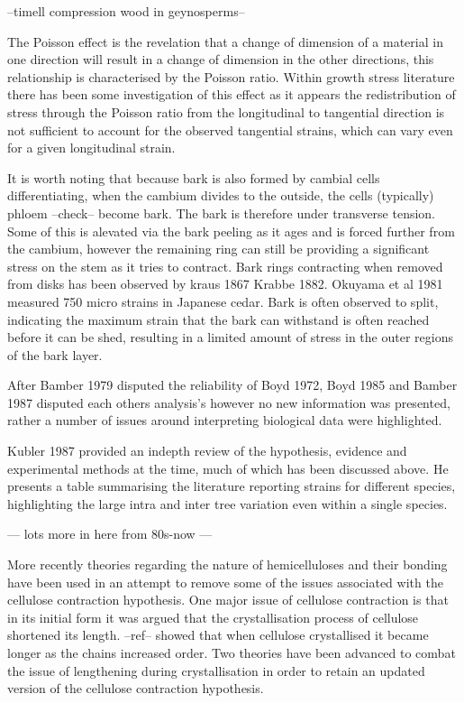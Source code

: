\documentclass{article}
\begin{document}
--timell compression wood in geynosperms--

The Poisson effect is the revelation that a change of dimension of a material
in one direction will result in a change of dimension in the other directions,
this relationship is characterised by the Poisson ratio. Within growth stress
literature there has been some investigation of this effect as it appears the
redistribution of stress through the Poisson ratio from the longitudinal to
tangential direction is not sufficient to account for the observed tangential
strains, which can vary even for a given longitudinal strain.

It is worth noting that because bark is also formed by cambial cells
differentiating, when the cambium divides to the outside, the cells (typically)
phloem --check-- become bark. The bark is therefore under transverse tension.
Some of this is alevated via the bark peeling as it ages and is forced further
from the cambium, however the remaining ring can still be providing a
significant stress on the stem as it tries to contract. Bark rings contracting
when removed from disks has been observed by kraus 1867 Krabbe 1882. Okuyama et
al 1981 measured 750 micro strains in Japanese cedar. Bark is often observed to
split, indicating the maximum strain that the bark can withstand is often
reached before it can be shed, resulting in a limited amount of stress in the
outer regions of the bark layer.

After Bamber 1979 disputed the reliability of Boyd 1972, Boyd 1985 and Bamber
1987 disputed each others analysis's however no new information was presented,
rather a number of issues around interpreting biological data were highlighted.

Kubler 1987 provided an indepth review of the hypothesis, evidence and
experimental methods at the time, much of which has been discussed above. He
presents a table summarising the literature reporting strains for different
species, highlighting the large intra and inter tree variation even within a
single species.

--- lots more in here from 80s-now ---

More recently theories regarding the nature of hemicelluloses and their bonding
have been used in an attempt to remove some of the issues associated with the
cellulose contraction hypothesis. One major issue of cellulose contraction is
that in its initial form it was argued that the crystallisation process of cellulose
shortened its length. --ref-- showed that when cellulose crystallised it became
longer as the chains increased order. Two theories have been advanced to combat
the issue of lengthening during crystallisation in order to retain an updated
version of the cellulose contraction hypothesis.
\end{document}

